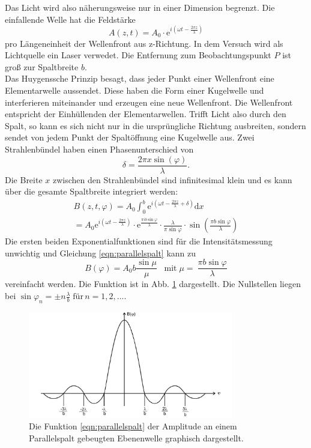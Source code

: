Das Licht wird also näherungsweise nur in einer Dimension begrenzt.
Die einfallende Welle hat die Feldstärke
\begin{equation*}
    A(z,t) = A_0 \cdot \mathrm{e}^{i(\omega t - \frac{2 \pi z}{\lambda})}
\end{equation*}
pro Längeneinheit der Wellenfront aus z-Richtung.
In dem Versuch wird als Lichtquelle ein Laser verwedet.
Die Entfernung zum Beobachtungspunkt $P$ ist groß zur Spaltbreite $b$.
\\
Das Huygenssche Prinzip besagt, dass jeder Punkt einer Wellenfront eine Elementarwelle aussendet.
Diese haben die Form einer Kugelwelle und interferieren miteinander und erzeugen eine neue Wellenfront.
Die Wellenfront entspricht der Einhüllenden der Elementarwellen.
Trifft Licht also durch den Spalt, so kann es sich nicht nur in die ursprüngliche Richtung ausbreiten, sondern sendet von jedem Punkt der Spaltöffnung eine Kugelwelle aus.
Zwei Strahlenbündel haben einen Phasenunterschied von
\begin{equation}
    \delta = \frac{2\pi x \sin (\varphi)}{\lambda} .
\end{equation}
Die Breite $x$ zwischen den Strahlenbündel sind infinitesimal klein und es kann über die gesamte Spaltbreite integriert werden:
\begin{align}
    B(z,t,\varphi) = A_0 \int_0^b \mathrm{e}^{i(\omega t - \frac{2 \pi z}{\lambda} + \delta)} \mathrm{d}x \\
   = A_0 \mathrm{e}^{i \left (\omega t - \frac{2 \pi z}{\lambda} \right )} \cdot \mathrm{e}^{\frac{\pi i b \sin \varphi}{\lambda}} \cdot \frac{\lambda}{\pi \sin \varphi} \cdot \sin \left (\frac{\pi b \sin \varphi}{\lambda} \right )
   \label{eqn:parallelspalt}
\end{align}
Die ersten beiden Exponentialfunktionen sind für die Intensitätsmessung unwichtig und Gleichung \eqref{eqn:parallelspalt} kann zu
\begin{equation}
    B(\varphi) = A_0 b \frac{\sin \mu}{\mu} \;\;\; \text{mit} \; \mu =\ \frac{\pi b \sin \varphi}{\lambda}
\end{equation}
vereinfacht werden.
Die Funktion ist in Abb. \ref{fig:funktion_parallel} dargestellt.
Die Nullstellen liegen bei $\sin \varphi_n = \pm n \frac{\lambda}{b} \; \text{für} \, n = 1, 2, ...$.
\begin{figure}
    \centering
    \includegraphics[width=0.8\textwidth]{content/data/funktion_parallel.jpg}
    \caption{Die Funktion \eqref{eqn:parallelspalt} der Amplitude an einem Parallelspalt gebeugten Ebenenwelle graphisch dargestellt. \cite[4]{anleitung}}
    \label{fig:funktion_parallel}
\end{figure}
